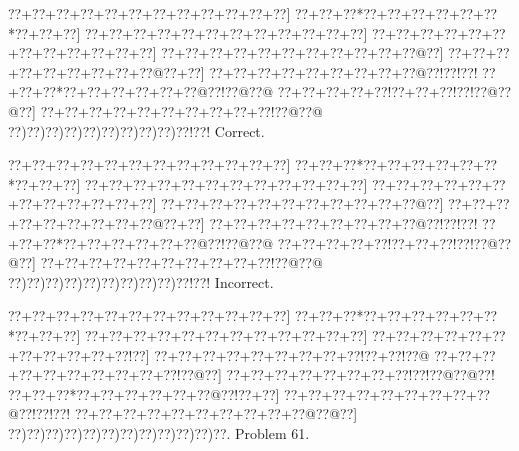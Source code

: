 \documentclass[a5paper]{article}
\begin{document}
\begin{center}
{\goo
\0??+\0??+\0??+\0??+\0??+\0??+\0??+\0??+\0??+\0??+\0??+\0??]
\0??+\0??+\0??*\0??+\0??+\0??+\0??+\0??+\0??*\0??+\0??+\0??]
\0??+\0??+\0??+\0??+\0??+\0??+\0??+\0??+\0??+\0??+\0??+\0??]
\0??+\0??+\0??+\0??+\0??+\0??+\0??+\0??+\0??+\0??+\0??+\0??]
\0??+\0??+\0??+\0??+\0??+\0??+\0??+\0??+\0??+\0??+\0??@\0??]
\0??+\0??+\0??+\0??+\0??+\0??+\0??+\0??+\0??@\0??+\0??]
\0??+\0??+\0??+\0??+\0??+\0??+\0??+\0??+\0??@\0??!\0??!\0??!
\0??+\0??+\0??*\0??+\0??+\0??+\0??+\0??+\0??@\0??!\0??@\0??@
\0??+\0??+\0??+\0??+\0??!\0??+\0??+\0??!\0??!\0??@\0??@\0??]
\0??+\0??+\0??+\0??+\0??+\0??+\0??+\0??+\0??+\0??!\0??@\0??@
\0??)\0??)\0??)\0??)\0??)\0??)\0??)\0??)\0??)\0??!\0??!
}
Correct. 

\end{center}
\begin{center}
{\goo
\0??+\0??+\0??+\0??+\0??+\0??+\0??+\0??+\0??+\0??+\0??+\0??]
\0??+\0??+\0??*\0??+\0??+\0??+\0??+\0??+\0??*\0??+\0??+\0??]
\0??+\0??+\0??+\0??+\0??+\0??+\0??+\0??+\0??+\0??+\0??+\0??]
\0??+\0??+\0??+\0??+\0??+\0??+\0??+\0??+\0??+\0??+\0??+\0??]
\0??+\0??+\0??+\0??+\0??+\0??+\0??+\0??+\0??+\0??+\0??@\0??]
\0??+\0??+\0??+\0??+\0??+\0??+\0??+\0??+\0??@\0??+\0??]
\0??+\0??+\0??+\0??+\0??+\0??+\0??+\0??+\0??@\0??!\0??!\0??!
\0??+\0??+\0??*\0??+\0??+\0??+\0??+\0??+\0??@\0??!\0??@\0??@
\0??+\0??+\0??+\0??+\0??!\0??+\0??+\0??!\0??!\0??@\0??@\0??]
\0??+\0??+\0??+\0??+\0??+\0??+\0??+\0??+\0??+\0??!\0??@\0??@
\0??)\0??)\0??)\0??)\0??)\0??)\0??)\0??)\0??)\0??!\0??!
}
Incorrect. 

\end{center}
\newpage
\begin{center}
{\goo
\0??+\0??+\0??+\0??+\0??+\0??+\0??+\0??+\0??+\0??+\0??+\0??]
\0??+\0??+\0??*\0??+\0??+\0??+\0??+\0??+\0??*\0??+\0??+\0??]
\0??+\0??+\0??+\0??+\0??+\0??+\0??+\0??+\0??+\0??+\0??+\0??]
\0??+\0??+\0??+\0??+\0??+\0??+\0??+\0??+\0??+\0??+\0??!\0??]
\0??+\0??+\0??+\0??+\0??+\0??+\0??+\0??+\0??!\0??+\0??!\0??@
\0??+\0??+\0??+\0??+\0??+\0??+\0??+\0??+\0??+\0??!\0??@\0??]
\0??+\0??+\0??+\0??+\0??+\0??+\0??+\0??!\0??!\0??@\0??@\0??!
\0??+\0??+\0??*\0??+\0??+\0??+\0??+\0??+\0??@\0??!\0??+\0??]
\0??+\0??+\0??+\0??+\0??+\0??+\0??+\0??+\0??@\0??!\0??!\0??!
\0??+\0??+\0??+\0??+\0??+\0??+\0??+\0??+\0??+\0??@\0??@\0??]
\0??)\0??)\0??)\0??)\0??)\0??)\0??)\0??)\0??)\0??)\0??)\0??.
}
Problem 61.

\end{center}
\end{document}
